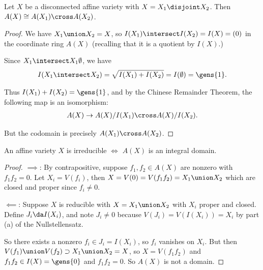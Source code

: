 \begin{proposition}[?]

Let \(X\) be a disconnected affine variety with
\(X = X_1 \disjoint X_2\). Then \(A(X) \cong A(X_1) \cross A(X_2)\).

\end{proposition}

\begin{proof}

We have \(X_1 \union X_2 = X\), so
\(I(X_1) \intersect I(X_2) = I(X) = (0)\) in the coordinate ring
\(A(X)\) (recalling that it is a quotient by \(I(X)\).)

Since \(X_1 \intersect X_1 \emptyset\), we have
\begin{align*}  
I(X_1 \intersect X_2) = \sqrt{I(X_1) + I(X_2) } = I(\emptyset) = \gens{1}
.\end{align*}

Thus \(I(X_1) + I(X_2) = \gens{1}\), and by the Chinese Remainder
Theorem, the following map is an isomorphism:
\begin{align*}  
A(X) \to A(X)/I(X_1) \cross A(X) / I(X_2)
.\end{align*}

But the codomain is precisely \(A(X_1) \cross A(X_2)\).

\end{proof}

\begin{proposition}[?]

An affine variety \(X\) is irreducible \(\iff\) \(A(X)\) is an integral
domain.

\end{proposition}

\begin{proof}

\(\implies\): By contrapositive, suppose \(f_1, f_2 \in A(X)\) are
nonzero with \(f_1 f_2 = 0\). Let \(X_i = V(f_i)\), then
\(X= V(0) = V(f_1 f_2) = X_1 \union X_2\) which are closed and proper
since \(f_i \neq 0\).

\hfill\break

\(\impliedby\): Suppose \(X\) is reducible with \(X = X_1 \union X_2\)
with \(X_i\) proper and closed. Define \(J_i \da I(X_i)\), and note
\(J_i \neq 0\) because \(V(J_i) = V(I(X_i)) = X_i\) by part (a) of the
Nullstellensatz.

So there exists a nonzero \(f_i \in J_i = I(X_i)\), so \(f_i\) vanishes
on \(X_i\). But then
\(V(f_1) \union V(f_2) \supset X_1 \union X_2 = X\), so
\(X= V(f_1 f_2)\) and \(f_1 f_2 \in I(X) = \gens{0}\) and
\(f_1 f_2 = 0\). So \(A(X)\) is not a domain.

\end{proof}

